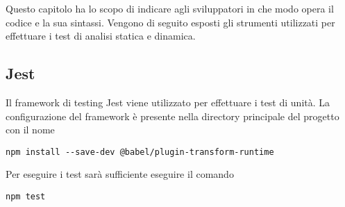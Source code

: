 \documentclass[../manuale_sviluppatore.tex]{subfiles}
\begin{document}
Questo capitolo ha lo scopo di indicare agli sviluppatori in che modo opera il codice e la sua sintassi. 
Vengono di seguito esposti gli strumenti utilizzati per effettuare i test di analisi statica e dinamica.

\subsection{Jest}
Il framework di testing Jest viene utilizzato per effettuare i test di unità. La configurazione del framework è presente nella directory principale del progetto con il nome \\
\begin{center}
    \verb|npm install --save-dev @babel/plugin-transform-runtime|
\end{center}

Per eseguire i test sarà sufficiente eseguire il comando \\
\begin{center}
\verb|npm test|
\end{center}
\end{document}

